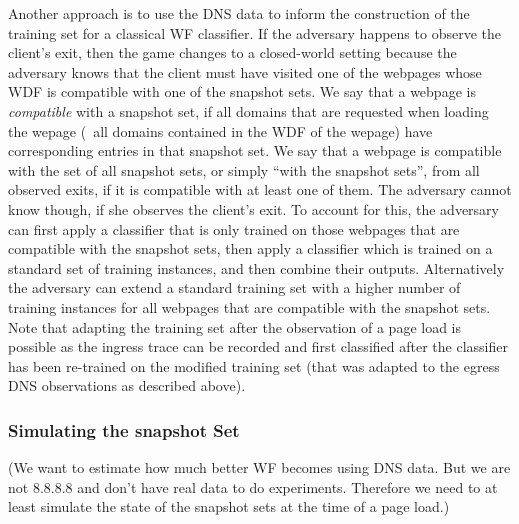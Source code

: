 Another approach is to use the DNS data to inform the construction of
the training set for a classical WF classifier.
%
If the adversary happens to observe the client's exit, then the game
changes to a closed-world setting because the adversary knows that the
client must have visited one of the webpages whose WDF is compatible
with one of the snapshot sets.
%
We say that a webpage is \emph{compatible} with a snapshot set, if all
domains that are requested when loading the wepage (\ie~all domains
contained in the WDF of the wepage) have corresponding entries in that
snapshot set. We say that a webpage is compatible with the set of all
snapshot sets, or simply ``with the snapshot sets'', from all observed
exits, if it is compatible with at least one of them.
%
The adversary cannot know though, if she observes the client's exit.
%
To account for this, the adversary can first apply a classifier that is
only trained on those webpages that are compatible with the snapshot
sets, then apply a classifier which is trained on a standard set of
training instances, and then combine their outputs.
%
Alternatively the adversary can extend a standard training set with a
higher number of training instances for all webpages that are compatible
with the snapshot sets.
%
Note that adapting the training set after the observation of a page load
is possible as the ingress trace can be recorded and first classified
after the classifier has been re-trained on the modified training set
(that was adapted to the egress DNS observations as described above).


\subsubsection{Simulating the snapshot Set}
(We want to estimate how much better WF becomes using DNS data. But we
are not 8.8.8.8 and don't have real data to do experiments. Therefore we
need to at least simulate the state of the snapshot sets at the time of
a page load.) %
